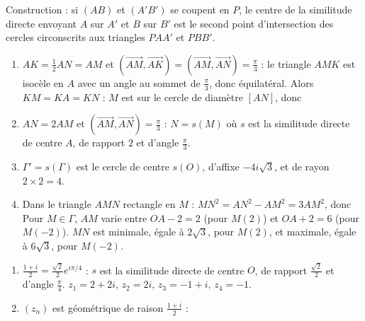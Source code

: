 \begin{corrige}
\begin{sol}
\begin{enumerate}
            Construction : si $(AB)$ et $(A'B')$ se coupent en $P$, le centre de la similitude directe envoyant $A$ sur $A'$ et $B$ sur $B'$
            est le second point d'intersection des cercles circonscrits aux triangles $PAA'$ et $PBB'$.
\end{enumerate}
\end{sol}
\begin{sol}
\begin{enumerate}
      \item $AK = \frac12 AN = AM$ et $(\overrightarrow{AM},\overrightarrow{AK}) = (\overrightarrow{AM},\overrightarrow{AN}) = \frac{\pi}{3}$ :
            le triangle $AMK$ est isocèle en $A$ avec un angle au sommet de $\frac{\pi}{3}$, donc équilatéral.
            Alors $KM = KA = KN$ : $M$ est sur le cercle de diamètre $[AN]$, donc 
      \item $AN = 2AM$ et $(\overrightarrow{AM},\overrightarrow{AN}) = \frac{\pi}{3}$ : $N = s(M)$ où $s$ est la similitude directe
            de centre $A$, de rapport $2$ et d'angle $\frac{\pi}{3}$.
      \item $\Gamma' = s(\Gamma)$ est le cercle de centre $s(O)$, d'affixe $-4i\sqrt3$, et de rayon $2 \times 2 = 4$.
      \item Dans le triangle $AMN$ rectangle en $M$ : $MN^2 = AN^2 - AM^2 = 3AM^2$, donc 
            Pour $M \in \Gamma$, $AM$ varie entre $OA - 2 = 2$ (pour $M(2)$) et $OA + 2 = 6$ (pour $M(-2)$).
            $MN$ est minimale, égale à $2\sqrt3$, pour $M(2)$, et maximale, égale à $6\sqrt3$, pour $M(-2)$.
\end{enumerate}
\end{sol}
\begin{sol}
\begin{enumerate}
      \item $\frac{1+i}{2} = \frac{\sqrt2}{2}e^{i\pi/4}$ : $s$ est la similitude directe de centre $O$, de rapport $\frac{\sqrt2}{2}$ et d'angle $\frac{\pi}{4}$.
            $z_1 = 2 + 2i$, $z_2 = 2i$, $z_3 = -1 + i$, $z_4 = -1$.
      \item $(z_n)$ est géométrique de raison $\frac{1+i}{2}$ : 

\end{enumerate}
\end{sol}
\end{corrige}
